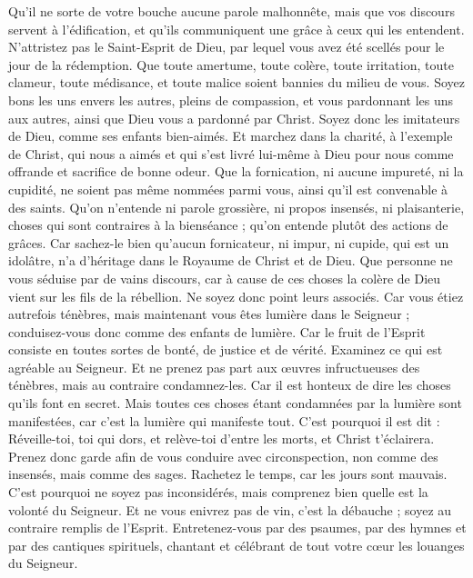 \begin{multicols}{2}
Qu’il ne sorte de votre bouche aucune parole malhonnête, mais que vos discours servent à l’édification, et qu’ils communiquent une grâce à ceux qui les entendent.
N'attristez pas le Saint-Esprit de Dieu, par lequel vous avez été scellés pour le jour de la rédemption.
Que toute amertume, toute colère, toute irritation, toute clameur, toute médisance, et toute malice soient bannies du milieu de vous.
Soyez bons les uns envers les autres, pleins de compassion, et vous pardonnant les uns aux autres, ainsi que Dieu vous a pardonné par Christ.
\VerseOne{}Soyez donc les imitateurs de Dieu, comme ses enfants bien-aimés.
Et marchez dans la charité, à l’exemple de Christ, qui nous a aimés et qui s'est livré lui-même à Dieu pour nous comme offrande et sacrifice de bonne odeur.
Que la fornication, ni aucune impureté, ni la cupidité, ne soient pas même nommées parmi vous, ainsi qu’il est convenable à des saints.
Qu’on n’entende ni parole grossière, ni propos insensés, ni plaisanterie, choses qui sont contraires à la bienséance ; qu’on entende plutôt des actions de grâces.
Car sachez-le bien qu’aucun fornicateur, ni impur, ni cupide, qui est un idolâtre, n'a d'héritage dans le Royaume de Christ et de Dieu.
Que personne ne vous séduise par de vains discours, car à cause de ces choses la colère de Dieu vient sur les fils de la rébellion.
Ne soyez donc point leurs associés.
Car vous étiez autrefois ténèbres, mais maintenant vous êtes lumière dans le Seigneur ; conduisez-vous donc comme des enfants de lumière.
Car le fruit de l'Esprit consiste en toutes sortes de bonté, de justice et de vérité.
Examinez ce qui est agréable au Seigneur.
Et ne prenez pas part aux œuvres infructueuses des ténèbres, mais au contraire condamnez-les.
Car il est honteux de dire les choses qu'ils font en secret.
Mais toutes ces choses étant condamnées par la lumière sont manifestées, car c’est la lumière qui manifeste tout.
C'est pourquoi il est dit : Réveille-toi, toi qui dors, et relève-toi d'entre les morts, et Christ t'éclairera.
Prenez donc garde afin de vous conduire avec circonspection, non comme des insensés, mais comme des sages.
Rachetez le temps, car les jours sont mauvais.
C'est pourquoi ne soyez pas inconsidérés, mais comprenez bien quelle est la volonté du Seigneur.
Et ne vous enivrez pas de vin, c’est la débauche ; soyez au contraire remplis de l'Esprit.
Entretenez-vous par des psaumes, par des hymnes et par des cantiques spirituels, chantant et célébrant de tout votre cœur les louanges du Seigneur.

\end{multicols}
